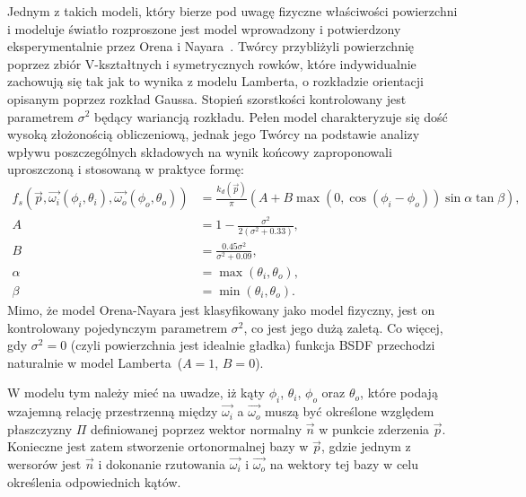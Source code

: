 Jednym z takich modeli, który bierze pod uwagę fizyczne właściwości powierzchni i modeluje światło rozproszone jest model wprowadzony i potwierdzony eksperymentalnie przez Orena i Nayara~\cite{Oren94generalizationof}\cite{Nayar95visualappearance}. Twórcy przybliżyli powierzchnię poprzez zbiór V-kształtnych i symetrycznych rowków, które indywidualnie zachowują się tak jak to wynika z modelu Lamberta, o rozkładzie orientacji opisanym poprzez rozkład Gaussa. Stopień szorstkości kontrolowany jest parametrem $\sigma^2$ będący wariancją rozkładu. Pełen model charakteryzuje się dość wysoką złożonością obliczeniową, jednak jego Twórcy na podstawie analizy wpływu poszczególnych składowych na wynik końcowy zaproponowali uproszczoną i stosowaną w praktyce formę:
\begin{align}
f_s(\vec{p}, \vec{\omega_i}(\phi_i, \theta_i), \vec{\omega_o}(\phi_o, \theta_o)) &= \frac{k_d(\vec{p})}{\pi}(A + B\max(0, \cos(\phi_i - \phi_o))\sin\alpha\tan\beta),\\
A &= 1 - \frac{\sigma^2}{2(\sigma^2 + 0.33)},\\
B &= \frac{0.45\sigma^2}{\sigma^2 + 0.09},\\
\alpha &= \max(\theta_i, \theta_o),\\
\beta &= \min(\theta_i, \theta_o).
\end{align}
Mimo, że model Orena-Nayara jest klasyfikowany jako model fizyczny, jest on kontrolowany pojedynczym parametrem $\sigma^2$, co jest jego dużą zaletą. Co więcej, gdy $\sigma^2 = 0$ (czyli powierzchnia jest idealnie gładka) funkcja BSDF przechodzi naturalnie w model Lamberta~($A=1$, $B=0$). 

W modelu tym należy mieć na uwadze, iż kąty $\phi_i$, $\theta_i$, $\phi_o$ oraz $\theta_o$, które podają wzajemną relację przestrzenną między $\vec{\omega_i}$ a $\vec{\omega_o}$ muszą być określone względem płaszczyzny $\Pi$ definiowanej poprzez wektor normalny $\vec{n}$ w punkcie zderzenia $\vec{p}$. Konieczne jest zatem stworzenie ortonormalnej bazy w $\vec{p}$, gdzie jednym z wersorów jest $\vec{n}$ i dokonanie rzutowania $\vec{\omega_i}$ i $\vec{\omega_o}$ na wektory tej bazy w celu określenia odpowiednich kątów.

